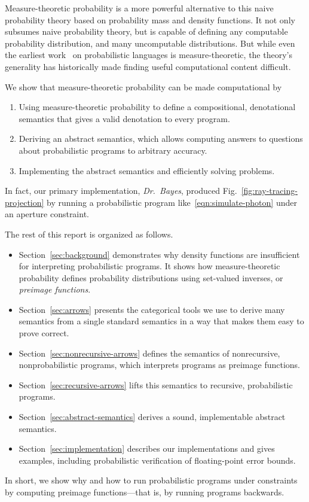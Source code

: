 \documentclass{llncs}
\newcommand{\figref}[1]{Fig.~\ref{#1}}
\begin{document}
Measure-theoretic probability is a more powerful alternative to this naive probability theory based on probability mass and density functions.
It not only subsumes naive probability theory, but is capable of defining any computable probability distribution, and many uncomputable distributions.
But while even the earliest work~\cite{cit:kozen-1979fcs-prob-programs-short} on probabilistic languages is measure-theoretic, the theory's generality has historically made finding useful computational content difficult.

We show that measure-theoretic probability can be made computational by
\begin{enumerate}
	\item Using measure-theoretic probability to define a compositional, denotational semantics that gives a valid denotation to every program.
	\item Deriving an abstract semantics, which allows computing answers to questions about probabilistic programs to arbitrary accuracy.
	\item Implementing the abstract semantics and efficiently solving problems.
\end{enumerate}
In fact, our primary implementation, \emph{Dr.~Bayes}, produced \figref{fig:ray-tracing-projection} by running a probabilistic program like~\eqref{eqn:simulate-photon} under an aperture constraint.

\vspace{0.5\baselineskip}

The rest of this report is organized as follows.
\begin{itemize}
	\item Section~\ref{sec:background} demonstrates why density functions are insufficient for interpreting probabilistic programs. It shows how measure-theoretic probability defines probability distributions using set-valued inverses, or \emph{preimage functions}.
	\item Section~\ref{sec:arrows} presents the categorical tools we use to derive many semantics from a single standard semantics in a way that makes them easy to prove correct.
	\item Section~\ref{sec:nonrecursive-arrows} defines the semantics of nonrecursive, nonprobabilistic programs, which interprets programs as preimage functions.
	\item Section~\ref{sec:recursive-arrows} lifts this semantics to recursive, probabilistic programs.
	\item Section~\ref{sec:abstract-semantics} derives a sound, implementable abstract semantics.
	\item Section~\ref{sec:implementation} describes our implementations and gives examples, including probabilistic verification of floating-point error bounds.
\end{itemize}
In short, we show why and how to run probabilistic programs under constraints by computing preimage functions---that is, by running programs backwards.
\end{document}
